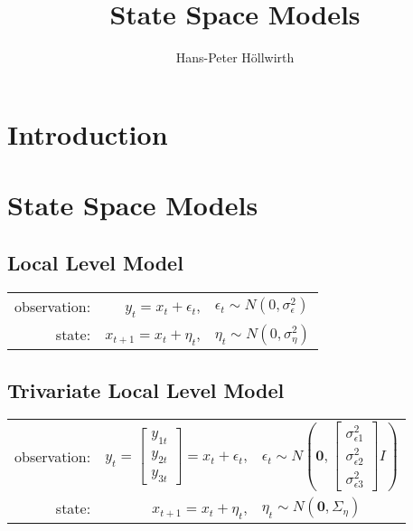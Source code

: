 \documentclass[11pt, oneside]{scrreprt}   	%
\title{\textit{}\\\textit{}\\State Space Models}
\author{Hans-Peter H{\"o}llwirth}
\date{}
\begin{document}
\maketitle

\newpage
\tableofcontents
\newpage

\chapter{Introduction}
\label{chp:introduction}



\chapter{State Space Models}
\label{chp:models}


\section{Local Level Model}

\begin{center}
\begin{tabular}{ r r l }
  observation: & $y_t = x_t + \epsilon_t$, & $\epsilon_t \sim N(0,\sigma_{\epsilon}^2)$ \\
  state: & $x_{t+1} = x_t + \eta_t$, & $\eta_t \sim N(0,\sigma_{\eta}^2)$ \\
\end{tabular}
\end{center}


\section{Trivariate Local Level Model}

\begin{center}
\begin{tabular}{ r r l }
  observation: & $y_t = \begin{bmatrix}y_{1t}\\ y_{2t} \\ y_{3t} \end{bmatrix} = x_t + \epsilon_t$, & $\epsilon_t \sim N(\textbf{0}, \begin{bmatrix}\sigma_{\epsilon 1}^2 \\ \sigma_{\epsilon 2}^2 \\ \sigma_{\epsilon 3}^2 \end{bmatrix} I)$ \\
  state: & $x_{t+1} = x_t + \eta_t$, & $\eta_t \sim N(\textbf{0}, \Sigma_{\eta})$ \\
\end{tabular}
\end{center}
\end{document}
